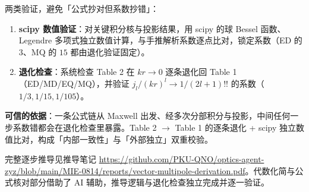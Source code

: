 两类验证，避免「公式抄对但系数抄错」：

\begin{enumerate}
  \item \textbf{scipy 数值验证}：对关键积分核与投影结果，用 scipy 的球 Bessel 函数、Legendre 多项式独立数值计算，与手推解析系数逐点比对，锁定系数（ED 的 $3$、MQ 的 $15$ 都由退化验证固定）。
  \item \textbf{退化检查}：系统检查 Table 2 在 $kr\to0$ 逐条退化回 Table 1（ED/MD/EQ/MQ），并验证 $j_l/(kr)^l\to1/(2l+1)!!$ 的系数（$1/3, 1/15, 1/105$）。
\end{enumerate}

\begin{important}
  \textbf{可信的依据}：一条公式链从 Maxwell 出发、经多次分部积分与投影，中间任何一步系数错都会在退化检查里暴露。Table 2 $\to$ Table 1 的逐条退化 + scipy 独立数值比对，构成「内部一致性」与「外部独立」双重校验。
\end{important}

完整逐步推导见推导笔记 \url{https://github.com/PKU-QNO/optics-agent-zyz/blob/main/MIE-0814/reports/vector-multipole-derivation.pdf}。代数化简与公式核对部分借助了 AI 辅助，推导逻辑与退化检查独立完成并逐一验证。

